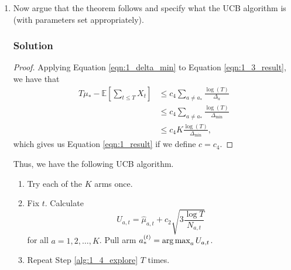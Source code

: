 \begin{enumerate}
\begin{proof}
    We have that
    \begin{align*}
      \mathbb{E}\left[\sum_{t \leq T} \left(\mu_* - X_t\right)\right]
      &=
        T\mu_* - \mathbb{E}\left[\sum_{t \leq T} X_t\right]
        = T\mu_* - \sum_{t \leq T} \mu_{a_t} \\
      &\leq \left(1 - \delta\right)c_3\sum_{a \neq a_*}\frac{\log\left(T/\delta\right)}{\Delta_{a}}
        + \delta T \\
      &= \left(1 - \frac{1}{T^2}\right)c_3\sum_{a \neq a_*}\frac{\log\left(T\right) + 2\log\left(T\right)}{\Delta_{a}}
        + \frac{1}{T} \\
      &= 3c_3 \sum_{a \neq a_*} \frac{\log\left(T\right)}{\Delta_{a}} - \frac{3c_3}{T^2} \sum_{a \neq a_*} \frac{\log\left(T\right)}{\Delta_{a}} + \frac{1}{T} \\
      &= O\left(\sum_{a \neq a_*} \frac{\log\left(T\right)}{\Delta_{a}}\right)
    \end{align*}
    asymptotically since the other terms decay with $T$. Thus, it follows that
    there exists some $c_4$ such that
    \begin{equation*}
      T\mu_* - \mathbb{E}\left[\sum_{t \leq T} X_t\right]
      \leq c_4\sum_{a \neq a_*} \frac{\log\left(T\right)}{\Delta_{a}}.
    \end{equation*}
  \end{proof}
\item Now argue that the theorem follows and specify what the UCB algorithm is
  (with parameters set appropriately).
  \subsubsection*{Solution}
  \begin{proof}
    Applying Equation \ref{eqn:1_delta_min} to Equation \ref{eqn:1_3_result}, we have that
    \begin{align*}
      T\mu_* - \mathbb{E}\left[\sum_{t \leq T} X_t\right]
      &\leq
        c_4 \sum_{a \neq a_*} \frac{\log\left(T\right)}{\Delta_a} \\
      &\leq
        c_4 \sum_{a \neq a_*} \frac{\log\left(T\right)}{\Delta_{\min}} \\
      &\leq c_4 K\frac{\log\left(T\right)}{\Delta_{\min}},
    \end{align*}
    which gives us Equation \ref{eqn:1_result} if we define $c = c_4$.    
  \end{proof}

  Thus, we have the following UCB algorithm.
  \begin{enumerate}[label=(\arabic*)]
  \item Try each of the $K$ arms once.
  \item Fix $t$. Calculate \begin{equation} U_{a,t} = \hat{\mu}_{a,t} +
      c_2\sqrt{3\frac{\log{T}}{N_{a,t}}}
      \label{eqn:1_4_upper_bound}
    \end{equation}
    for all $a = 1,2,\ldots,K$. Pull arm $a_{*}^{(t)} = \operatorname*{arg\,max}_a U_{a,t}$.
    \label{alg:1_4_explore}
  \item Repeat Step \ref{alg:1_4_explore} $T$ times.
  \end{enumerate}
\end{enumerate}
